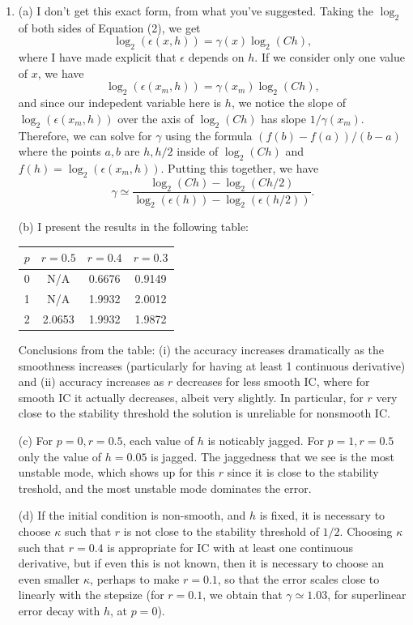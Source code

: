 \documentclass[11pt]{article}
\def\f{\frac }
\begin{document}
\begin{enumerate}


\item (a) I don't get this exact form, from what you've suggested.
Taking the $\log _{2}$ of both sides of Equation (2), we get
\[ \log _2 \left (\epsilon (x,h) \right ) = \gamma(x) \log_2 \left (Ch \right ) ,\]
where I have made explicit that $\epsilon$ depends on $h$.
If we consider only one value of $x$, we have
\[ \log _2 \left (\epsilon (x_m,h) \right ) = \gamma(x_m) \log_2 \left (Ch \right ) ,\]
and since our indepedent variable here is $h$, we notice the slope of $\log _2 (\epsilon (x_m , h) )$ over the axis of $\log _2 (Ch)$ has slope $1/\gamma(x_m)$.
Therefore, we can solve for $\gamma$ using the formula $(f(b)-f(a))/(b-a)$ where the points $a,b$ are $h,h/2$ inside of $\log _2 (Ch)$ and $f(h) = \log _2 (\epsilon (x_m , h) )$.
Putting this together, we have
\[ \gamma \simeq \f{\log _2 (Ch) - \log_2(Ch/2)}{\log_2 (\epsilon (h)) - \log_2 (\epsilon (h/2))} .\]

(b) I present the results in the following table:

\begin{table}[h]
  \begin{center}
    \begin{tabular}{cccc}
      \hline
      $p$ & $r = 0.5$ & $r=0.4$ & $r=0.3$ \\
      \hline
      \hline
      0  & N/A & 0.6676 & 0.9149 \\
      1  & N/A & 1.9932 & 2.0012 \\
      2  & 2.0653 & 1.9932 & 1.9872\\
      \hline
    \end{tabular}
  \end{center}
\end{table}

Conclusions from the table: (i) the accuracy increases dramatically as the smoothness increases (particularly for having at least 1 continuous derivative) and (ii) accuracy increases as $r$ decreases for less smooth IC, where for smooth IC it actually decreases, albeit very slightly.
In particular, for $r$ very close to the stability threshold the solution is unreliable for nonsmooth IC.

(c) For $p = 0, r = 0.5$, each value of $h$ is noticably jagged.
For $p = 1, r = 0.5$ only the value of $h = 0.05$ is jagged.
The jaggedness that we see is the most unstable mode, which shows up for this $r$ since it is close to the stability treshold, and the most unstable mode dominates the error.

(d) If the initial condition is non-smooth, and $h$ is fixed, it is necessary to choose $\kappa$ such that $r$ is not close to the stability threshold of $1/2$.
Choosing $\kappa$ such that $r = 0.4$ is appropriate for IC with at least one continuous derivative, but if even this is not known, then it is necessary to choose an even smaller $\kappa$, perhaps to make $r = 0.1$, so that the error scales close to linearly with the stepsize (for $r = 0.1$, we obtain that $\gamma \simeq 1.03$, for superlinear error decay with $h$, at $p = 0$).

\end{enumerate}
\end{document}
